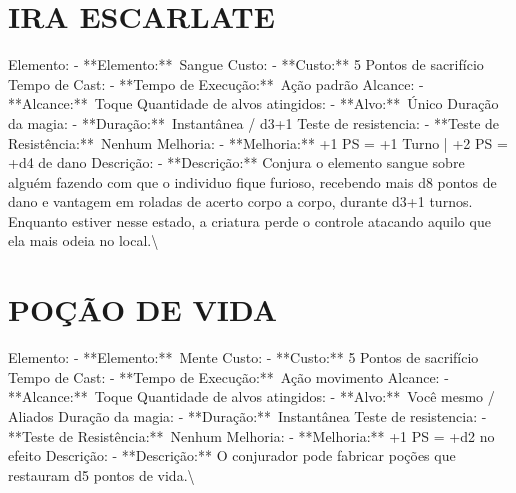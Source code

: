 \documentclass{article}%
\begin{document}
\section{IRA ESCARLATE}%
\label{sec:IRAESCARLATE}%
Elemento: {-} **Elemento:**~Sangue\newline%
Custo: {-} **Custo:** 5 Pontos de sacrifício\newline%
Tempo de Cast: {-} **Tempo de Execução:**~Ação padrão\newline%
Alcance: {-} **Alcance:**~Toque\newline%
Quantidade de alvos atingidos: {-} **Alvo:**~Único\newline%
Duração da magia: {-} **Duração:**~Instantânea / d3+1\newline%
Teste de resistencia: {-} **Teste de Resistência:**~Nenhum\newline%
Melhoria: {-} **Melhoria:** +1 PS = +1 Turno | +2 PS = +d4 de dano\newline%
Descrição: {-} **Descrição:** Conjura o elemento sangue sobre alguém fazendo com que o individuo fique furioso, recebendo mais d8 pontos de dano e vantagem em roladas de acerto corpo a corpo, durante d3+1 turnos. Enquanto estiver nesse estado, a criatura perde o controle atacando aquilo que ela mais odeia no local.\textbackslash{}

%
\section{POÇÃO DE VIDA}%
\label{sec:POODEVIDA}%
Elemento: {-} **Elemento:**~Mente\newline%
Custo: {-} **Custo:** 5 Pontos de sacrifício\newline%
Tempo de Cast: {-} **Tempo de Execução:**~Ação movimento\newline%
Alcance: {-} **Alcance:**~Toque\newline%
Quantidade de alvos atingidos: {-} **Alvo:**~Você mesmo / Aliados\newline%
Duração da magia: {-} **Duração:**~Instantânea\newline%
Teste de resistencia: {-} **Teste de Resistência:**~Nenhum\newline%
Melhoria: {-} **Melhoria:** +1 PS = +d2 no efeito\newline%
Descrição: {-} **Descrição:** O conjurador pode fabricar poções que restauram d5 pontos de vida.\textbackslash{}

%
\end{document}
